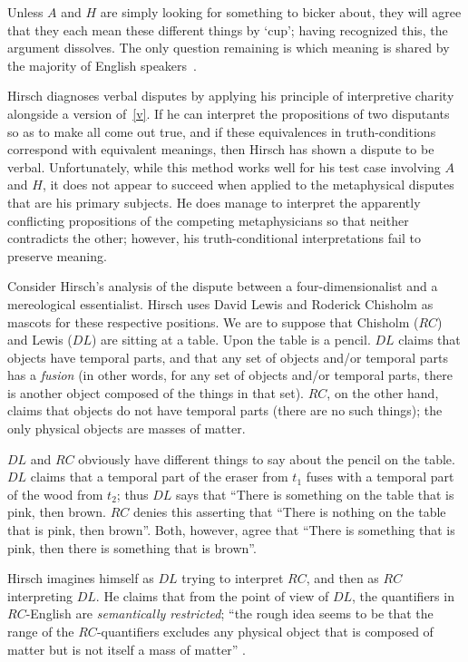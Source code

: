 \documentclass[11pt]{article}
\begin{document}
\begin{spacing}{1.25}
Unless $A$ and $H$ are simply looking for something to bicker about,
they will agree that they each mean these different things by `cup';
having recognized this, the argument dissolves.  The only question
remaining is which meaning is shared by the majority of English
speakers~\citep[70]{hirsch2005}.

Hirsch diagnoses verbal disputes by applying his principle of
interpretive charity alongside a version of~\ref{v}.  If he can
interpret the propositions of two disputants so as to make all come
out true, and if these equivalences in truth-conditions correspond
with equivalent meanings, then Hirsch has shown a dispute to be
verbal.  Unfortunately, while this method works well for his test case
involving $A$ and $H$, it does not appear to succeed when applied to
the metaphysical disputes that are his primary subjects.  He does
manage to interpret the apparently conflicting propositions of the
competing metaphysicians so that neither contradicts the other;
however, his truth-conditional interpretations fail to preserve
meaning.

Consider Hirsch's analysis of the dispute between a
four-dimensionalist and a mereological essentialist.  Hirsch uses
David Lewis and Roderick Chisholm as mascots for these respective
positions.  We are to suppose that Chisholm ($RC$) and Lewis ($DL$)
are sitting at a table.  Upon the table is a pencil. $DL$ claims that
objects have temporal parts, and that any set of objects and/or
temporal parts has a {\em fusion} (in other words, for any set of
objects and/or temporal parts, there is another object composed of the
things in that set).  $RC$, on the other hand, claims that objects do
not have temporal parts (there are no such things); the only physical
objects are masses of matter.

$DL$ and $RC$ obviously have different things to say about the pencil
on the table.  $DL$ claims that a temporal part of the eraser from
$t_{1}$ fuses with a temporal part of the wood from $t_{2}$; thus $DL$
says that ``There is something on the table that is pink, then brown.
$RC$ denies this asserting that ``There is nothing on the table that
is pink, then brown''.  Both, however, agree that ``There is something
that is pink, then there is something that is brown''.

Hirsch imagines himself as $DL$ trying to interpret $RC$, and then as
$RC$ interpreting $DL$.  He claims that from the point of view of
$DL$, the quantifiers in $RC$-English are {\em semantically
  restricted}; ``the rough idea seems to be that the range of the
$RC$-quantifiers excludes any physical object that is composed of
matter but is not itself a mass of matter'' \citep[76]{hirsch2005}.


\end{spacing}
\end{document}
